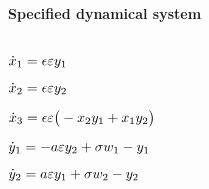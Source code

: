 
\(\)
\paragraph{Specified dynamical system}
\(
\)\par

\(\dot x_{1}=\epsilon  \varepsilon y_{1}
\)\par

\(\dot x_{2}=\epsilon  \varepsilon y_{2}
\)\par

\(\dot x_{3}=\epsilon  \varepsilon \big(-x_{2} y_{1}+x_{1} y_{2}\big)
\)\par

\(\dot y_{1}=-a \varepsilon y_{2}+\sigma  w_{1}-y_{1}
\)\par

\(\dot y_{2}=a \varepsilon y_{1}+\sigma  w_{2}-y_{2}
\)\par
